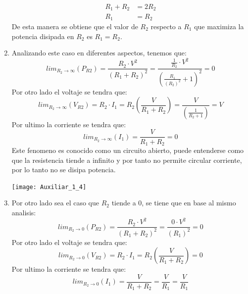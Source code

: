 \documentclass[
  11pt,
  letterpaper,
   addpoints,
   answers
  ]{exam}
\begin{document}
\begin{questions}
\begin{solution}
\begin{enumerate}
\begin{align}
                R_{1} + R_{2} &= 2R_{2}\\
                R_{1} &= R_{2}
            \end{align}
            De esta manera se obtiene que el valor de $R_{2}$ respecto a $R_{1}$ que maximiza la potencia disipada en $R_{2}$ es $R_{1} = R_{2}$.
            \item Analizando este caso en diferentes aspectos, tenemos que:
            \begin{equation}
                lim_{R_{2} \to \infty} (P_{R2}) = \frac{R_{2} \cdot V^{2}}{(R_{1} + R_{2})^{2}} = \frac{\frac{1}{R_{2}} \cdot V^{2}}{(\frac{R_{1}}{(R_{2})^{2}} + 1)^{2}} = 0
            \end{equation}
            Por otro lado el voltaje se tendra que:
            \begin{equation}
                lim_{R_{2} \to \infty} (V_{R2}) = R_{2} \cdot I_{1} = R_{2}\left( \frac{V}{R_{1} + R_{2}} \right) = \frac{V}{\left( \frac{1}{R_{2}+1}\right)} = V
            \end{equation}
        Por ultimo la corriente se tendra que:
        \begin{equation}
            lim_{R_{2} \to \infty} (I_{1}) = \frac{V}{R_{1} + R_{2}} = 0
        \end{equation}
        Este fenomeno es conocido como un circuito abierto, puede entenderse como que la resistencia tiende a infinito y por tanto no permite circular corriente, por lo tanto no se disipa potencia.
        \begin{center}
            \texttt{[image: Auxiliar\_1\_4]}
        \end{center}
        \item Por otro lado sea el caso que $R_{2}$ tiende a 0, se tiene que en base al mismo analisis:
        \begin{equation}
            lim_{R_{2} \to 0} (P_{R2}) = \frac{R_{2} \cdot V^{2}}{(R_{1} + R_{2})^{2}} = \frac{0 \cdot V^{2}}{(R_{1})^{2}} = 0
        \end{equation}
        Por otro lado el voltaje se tendra que:
        \begin{equation}
            lim_{R_{2} \to 0} (V_{R2}) = R_{2} \cdot I_{1} = R_{2}\left( \frac{V}{R_{1} + R_{2}} \right) = 0
        \end{equation}
        Por ultimo la corriente se tendra que:
        \begin{equation}
            lim_{R_{2} \to 0} (I_{1}) = \frac{V}{R_{1} + R_{2}} = \frac{V}{R_{1}} = \frac{V}{R_{1}}

\end{equation}
\end{enumerate}
\end{solution}
\end{questions}
\end{document}

